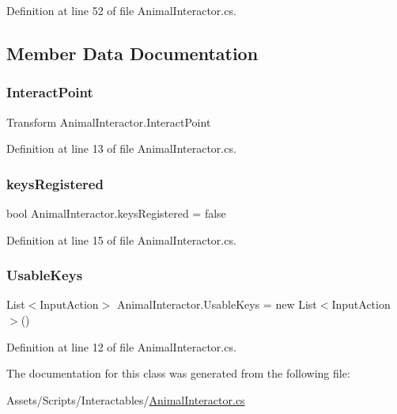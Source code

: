 Definition at line 52 of file Animal\+Interactor.\+cs.



\subsection{Member Data Documentation}
\mbox{\label{class_animal_interactor_abad93e377f12a32e8b96e0285c7fc1b2}} 
\subsubsection{\texorpdfstring{Interact\+Point}{InteractPoint}}
{\footnotesize\ttfamily Transform Animal\+Interactor.\+Interact\+Point}



Definition at line 13 of file Animal\+Interactor.\+cs.

\mbox{\label{class_animal_interactor_a25c06ce53b655dc41349cbe0df85ce3f}} 
\subsubsection{\texorpdfstring{keys\+Registered}{keysRegistered}}
{\footnotesize\ttfamily bool Animal\+Interactor.\+keys\+Registered = false\hspace{0.3cm}{\ttfamily [protected]}}



Definition at line 15 of file Animal\+Interactor.\+cs.

\mbox{\label{class_animal_interactor_a7de0dae23f6270d02fb18a1fcd9daeb1}} 
\subsubsection{\texorpdfstring{Usable\+Keys}{UsableKeys}}
{\footnotesize\ttfamily List$<$Input\+Action$>$ Animal\+Interactor.\+Usable\+Keys = new List$<$Input\+Action$>$()}



Definition at line 12 of file Animal\+Interactor.\+cs.



The documentation for this class was generated from the following file\+:\begin{DoxyCompactItemize}
\item 
Assets/\+Scripts/\+Interactables/\mbox{\hyperlink{_animal_interactor_8cs}{Animal\+Interactor.\+cs}}\end{DoxyCompactItemize}
